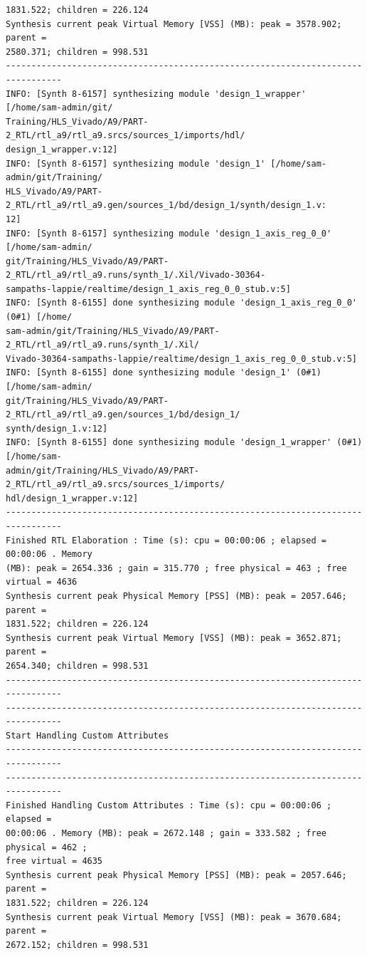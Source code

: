 \documentclass{article}
\begin{document}
\begin{lstlisting}
1831.522; children = 226.124
Synthesis current peak Virtual Memory [VSS] (MB): peak = 3578.902; parent = 
2580.371; children = 998.531
---------------------------------------------------------------------------------
INFO: [Synth 8-6157] synthesizing module 'design_1_wrapper' [/home/sam-admin/git/
Training/HLS_Vivado/A9/PART-2_RTL/rtl_a9/rtl_a9.srcs/sources_1/imports/hdl/
design_1_wrapper.v:12]
INFO: [Synth 8-6157] synthesizing module 'design_1' [/home/sam-admin/git/Training/
HLS_Vivado/A9/PART-2_RTL/rtl_a9/rtl_a9.gen/sources_1/bd/design_1/synth/design_1.v:
12]
INFO: [Synth 8-6157] synthesizing module 'design_1_axis_reg_0_0' [/home/sam-admin/
git/Training/HLS_Vivado/A9/PART-2_RTL/rtl_a9/rtl_a9.runs/synth_1/.Xil/Vivado-30364-
sampaths-lappie/realtime/design_1_axis_reg_0_0_stub.v:5]
INFO: [Synth 8-6155] done synthesizing module 'design_1_axis_reg_0_0' (0#1) [/home/
sam-admin/git/Training/HLS_Vivado/A9/PART-2_RTL/rtl_a9/rtl_a9.runs/synth_1/.Xil/
Vivado-30364-sampaths-lappie/realtime/design_1_axis_reg_0_0_stub.v:5]
INFO: [Synth 8-6155] done synthesizing module 'design_1' (0#1) [/home/sam-admin/
git/Training/HLS_Vivado/A9/PART-2_RTL/rtl_a9/rtl_a9.gen/sources_1/bd/design_1/
synth/design_1.v:12]
INFO: [Synth 8-6155] done synthesizing module 'design_1_wrapper' (0#1) [/home/sam-
admin/git/Training/HLS_Vivado/A9/PART-2_RTL/rtl_a9/rtl_a9.srcs/sources_1/imports/
hdl/design_1_wrapper.v:12]
---------------------------------------------------------------------------------
Finished RTL Elaboration : Time (s): cpu = 00:00:06 ; elapsed = 00:00:06 . Memory 
(MB): peak = 2654.336 ; gain = 315.770 ; free physical = 463 ; free virtual = 4636
Synthesis current peak Physical Memory [PSS] (MB): peak = 2057.646; parent = 
1831.522; children = 226.124
Synthesis current peak Virtual Memory [VSS] (MB): peak = 3652.871; parent = 
2654.340; children = 998.531
---------------------------------------------------------------------------------
---------------------------------------------------------------------------------
Start Handling Custom Attributes
---------------------------------------------------------------------------------
---------------------------------------------------------------------------------
Finished Handling Custom Attributes : Time (s): cpu = 00:00:06 ; elapsed = 
00:00:06 . Memory (MB): peak = 2672.148 ; gain = 333.582 ; free physical = 462 ; 
free virtual = 4635
Synthesis current peak Physical Memory [PSS] (MB): peak = 2057.646; parent = 
1831.522; children = 226.124
Synthesis current peak Virtual Memory [VSS] (MB): peak = 3670.684; parent = 
2672.152; children = 998.531

\end{lstlisting}
\end{document}
